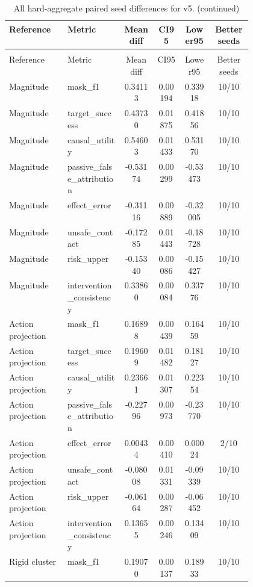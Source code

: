 \documentclass{article}
\begin{document}
\begin{center}
\scriptsize
\begin{longtable}{p{0.24\linewidth}p{0.23\linewidth}cccc}
\caption{All hard-aggregate paired seed differences for v5.}\label{tab:full-hard-pairs}\\
\toprule
Reference & Metric & Mean diff & CI95 & Lower95 & Better seeds\\
\midrule
\endfirsthead
\caption[]{All hard-aggregate paired seed differences for v5. (continued)}\\
\toprule
Reference & Metric & Mean diff & CI95 & Lower95 & Better seeds\\
\midrule
\endhead
Magnitude & mask\_f1 & 0.34113 & 0.00194 & 0.33918 & 10/10\\
Magnitude & target\_success & 0.43730 & 0.01875 & 0.41856 & 10/10\\
Magnitude & causal\_utility & 0.54603 & 0.01433 & 0.53170 & 10/10\\
Magnitude & passive\_false\_attribution & -0.53174 & 0.00299 & -0.53473 & 10/10\\
Magnitude & effect\_error & -0.31116 & 0.00889 & -0.32005 & 10/10\\
Magnitude & unsafe\_contact & -0.17285 & 0.01443 & -0.18728 & 10/10\\
Magnitude & risk\_upper & -0.15340 & 0.00086 & -0.15427 & 10/10\\
Magnitude & intervention\_consistency & 0.33860 & 0.00084 & 0.33776 & 10/10\\
Action projection & mask\_f1 & 0.16898 & 0.00439 & 0.16459 & 10/10\\
Action projection & target\_success & 0.19609 & 0.01482 & 0.18127 & 10/10\\
Action projection & causal\_utility & 0.23661 & 0.01307 & 0.22354 & 10/10\\
Action projection & passive\_false\_attribution & -0.22796 & 0.00973 & -0.23770 & 10/10\\
Action projection & effect\_error & 0.00434 & 0.00410 & 0.00024 & 2/10\\
Action projection & unsafe\_contact & -0.08008 & 0.01331 & -0.09339 & 10/10\\
Action projection & risk\_upper & -0.06164 & 0.00287 & -0.06452 & 10/10\\
Action projection & intervention\_consistency & 0.13655 & 0.00246 & 0.13409 & 10/10\\
Rigid cluster & mask\_f1 & 0.19070 & 0.00137 & 0.18933 & 10/10\\

\end{longtable}
\end{center}
\end{document}
